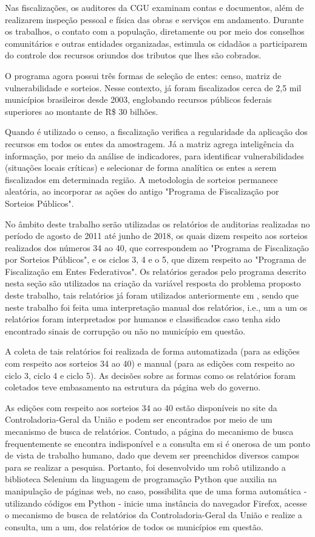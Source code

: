 Nas fiscalizações, os auditores da CGU examinam contas e documentos, além de realizarem inspeção pessoal e física das obras e serviços em andamento. Durante os trabalhos, o contato com a população, diretamente ou por meio dos conselhos comunitários e outras entidades organizadas, estimula os cidadãos a participarem do controle dos recursos oriundos dos tributos que lhes são cobrados.

O programa agora possui três formas de seleção de entes: censo, matriz de vulnerabilidade e sorteios. Nesse contexto, já foram fiscalizados cerca de 2,5 mil municípios brasileiros desde 2003, englobando recursos públicos federais superiores ao montante de R\$ 30 bilhões.

Quando é utilizado o censo, a fiscalização verifica a regularidade da aplicação dos recursos em todos os entes da amostragem. Já a matriz agrega inteligência da informação, por meio da análise de indicadores, para identificar vulnerabilidades (situações locais críticas) e selecionar de forma analítica os entes a serem fiscalizados em determinada região. A metodologia de sorteios permanece aleatória, ao incorporar as ações do antigo "Programa de Fiscalização por Sorteios Públicos".

No âmbito deste trabalho serão utilizadas os relatórios de auditorias realizadas no período de agosto de 2011 até junho de 2018, os quais dizem respeito aos sorteios realizados dos números 34 ao 40, que correspondem ao "Programa de Fiscalização por Sorteios Públicos", e os ciclos 3, 4 e o 5, que dizem respeito ao "Programa de Fiscalização em Entes Federativos". Os relatórios gerados pelo programa descrito nesta seção são utilizados na criação da variável resposta do problema proposto deste trabalho, tais relatórios já foram utilizados anteriormente em \citep{FerrazFinan2008}, sendo que neste trabalho foi feita uma interpretação manual dos relatórios, i.e., um a um os relatórios foram interpretados por humanos e classificados caso tenha sido encontrado sinais de corrupção ou não no município em questão.

A coleta de tais relatórios foi realizada de forma automatizada (para as edições com respeito aos sorteios 34 ao 40) e manual (para as edições com respeito ao ciclo 3, ciclo 4 e ciclo 5). As decisões sobre as formas como os relatórios foram coletados teve embasamento na estrutura da página web do governo.

As edições com respeito aos sorteios 34 ao 40 estão disponíveis no site da Controladoria-Geral da União e podem ser encontrados por meio de um mecanismo de busca de relatórios. Contudo, a página do mecanismo de busca frequentemente se encontra indisponível e a consulta em si é onerosa de um ponto de vista de trabalho humano, dado que devem ser preenchidos diversos campos para se realizar a pesquisa. Portanto, foi desenvolvido um robô utilizando a biblioteca Selenium \cite{Selenium} da linguagem de programação Python que auxilia na manipulação de páginas web, no caso, possibilita que de uma forma automática - utilizando códigos em Python - inicie uma instância do navegador Firefox, acesse o mecanismo de busca de relatórios da Controladoria-Geral da União e realize a consulta, um a um, dos relatórios de todos os municípios em questão.

